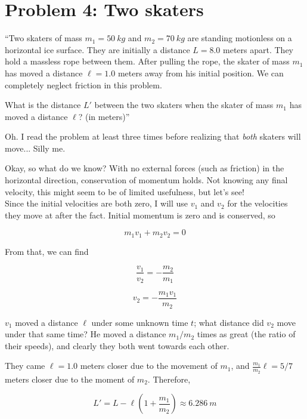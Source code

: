 \documentclass[8.01x]{subfiles}
\begin{document}
\section{Problem 4: Two skaters}

``Two skaters of mass $m_1 = \SI{50}{kg}$ and $m_2 = \SI{70}{kg}$ are standing motionless on a horizontal ice surface. They are initially a distance $L = 8.0$ meters apart. They hold a massless rope between them. After pulling the rope, the skater of mass $m_1$ has moved a distance $\ell = 1.0$ meters away from his initial position. We can completely neglect friction in this problem.

What is the distance $L'$ between the two skaters when the skater of mass $m_1$ has moved a distance $\ell$? (in meters)''

Oh. I read the problem at least three times before realizing that \emph{both} skaters will move... Silly me.

Okay, so what do we know? With no external forces (such as friction) in the horizontal direction, conservation of momentum holds. Not knowing any final velocity, this might seem to be of limited usefulness, but let's see!\\
Since the initial velocities are both zero, I will use $v_1$ and $v_2$ for the velocities they move at after the fact. Initial momentum is zero and is conserved, so

\begin{equation}
m_1 v_1 + m_2 v_2 = 0
\end{equation}

From that, we can find

\begin{equation}
\frac{v_1}{v_2} = - \frac{m_2}{m_1}
\end{equation}

\begin{equation}
v_2 = - \frac{m_1 v_1}{m_2}
\end{equation}

$v_1$ moved a distance $\ell$ under some unknown time $t$; what distance did $v_2$ move under that same time? He moved a distance $m_1/m_2$ times as great (the ratio of their speeds), and clearly they both went towards each other.

They came $\ell = 1.0$ meters closer due to the movement of $m_1$, and $\displaystyle \frac{m_1}{m_2} \ell = 5/7$ meters closer due to the moment of $m_2$. Therefore,

\begin{equation}
L' = L - \ell \left(1  + \frac{m_1}{m_2}\right) \approx \SI{6.286}{m}
\end{equation}
\end{document}
